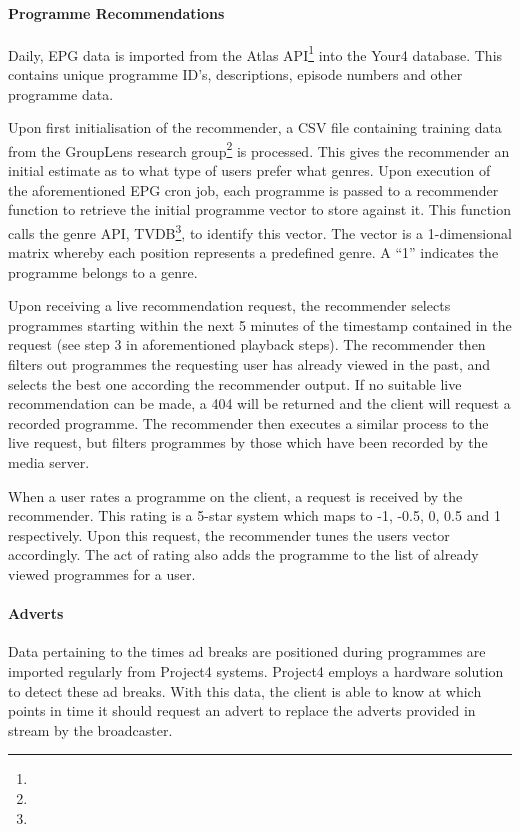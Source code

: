 \paragraph{Programme Recommendations}

Daily, EPG data is imported from the Atlas API\footnote{} into the Your4 database. This contains unique programme ID's, descriptions, episode numbers and other programme data.

Upon first initialisation of the recommender, a CSV file containing training data from the GroupLens research group\footnote{} is processed. This gives the recommender an initial estimate as to what type of users prefer what genres. Upon execution of the aforementioned EPG cron job, each programme is passed to a recommender function to retrieve the initial programme vector to store against it. This function calls the genre API, TVDB\footnote{}, to identify this vector. The vector is a 1-dimensional matrix whereby each position represents a predefined genre. A ``1'' indicates the programme belongs to a genre.

Upon receiving a live recommendation request, the recommender selects programmes starting within the next 5 minutes of the timestamp contained in the request (see step 3 in aforementioned playback steps). The recommender then filters out programmes the requesting user has already viewed in the past, and selects the best one according the recommender output. If no suitable live recommendation can be made, a 404 will be returned and the client will request a recorded programme. The recommender then executes a similar process to the live request, but filters programmes by those which have been recorded by the media server.

When a user rates a programme on the client, a request is received by the recommender. This rating is a 5-star system which maps to -1, -0.5, 0, 0.5 and 1 respectively. Upon this request, the recommender tunes the users vector accordingly. The act of rating also adds the programme to the list of already viewed programmes for a user.

\paragraph{Adverts}

Data pertaining to the times ad breaks are positioned during programmes are imported regularly from Project4 systems. Project4 employs a hardware solution to detect these ad breaks. With this data, the client is able to know at which points in time it should request an advert to replace the adverts provided in stream by the broadcaster.

